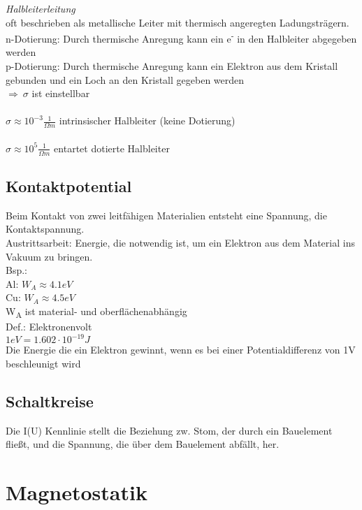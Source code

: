 \documentclass[a4paper,12pt]{report}
\begin{document}
\emph{Halbleiterleitung}\\
oft beschrieben als metallische Leiter mit thermisch angeregten Ladungsträgern.\\
n-Dotierung: Durch thermische Anregung kann ein e\textsuperscript{-} in den Halbleiter abgegeben werden\\
p-Dotierung: Durch thermische Anregung kann ein Elektron aus dem Kristall gebunden und ein Loch an den Kristall gegeben werden\\
$\Rightarrow \ \sigma$ ist einstellbar\\
\\
$ \sigma \approx 10^{-3} \frac{1}{\Omega m} $ intrinsischer Halbleiter (keine Dotierung)\\
\\
$ \sigma \approx 10^{5} \frac{1}{\Omega m} $ entartet dotierte Halbleiter\\

\subsection{Kontaktpotential}
Beim Kontakt von zwei leitfähigen Materialien entsteht eine Spannung, die Kontaktspannung.\\
Austrittsarbeit: Energie, die notwendig ist, um ein Elektron aus dem Material ins Vakuum zu bringen.\\
Bsp.:\\
Al: $W_A \approx 4.1 eV $\\
Cu: $ W_A \approx 4.5 eV$\\
W\textsubscript{A} ist material- und oberflächenabhängig\\

Def.: Elektronenvolt\\
$ 1eV = 1.602 \cdot 10^{-19} J $ \\
Die Energie die ein Elektron gewinnt, wenn es bei einer Potentialdifferenz von 1V beschleunigt wird\\

\subsection{Schaltkreise}
Die I(U) Kennlinie stellt die Beziehung zw. Stom, der durch ein Bauelement fließt, und die Spannung, die über dem Bauelement abfällt, her.\\

\section{Magnetostatik}
\end{document}
